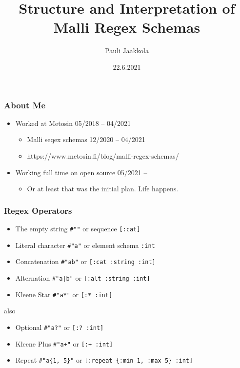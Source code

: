 \documentclass{beamer}
\title{Structure and Interpretation of Malli Regex Schemas}
\author{Pauli Jaakkola}
\date{22.6.2021}
\begin{document}
\frame{\titlepage}


\begin{frame}
\frametitle{About Me}

\begin{itemize}
\item Worked at Metosin 05/2018 -- 04/2021
\begin{itemize}
    \item Malli seqex schemas 12/2020 -- 04/2021
    \item https://www.metosin.fi/blog/malli-regex-schemas/
\end{itemize}
\item Working full time on open source 05/2021 --
\begin{itemize}
    \item Or at least that was the initial plan. Life happens.
\end{itemize}
\end{itemize}
\end{frame}


\begin{frame}
\frametitle{Regex Operators}

\begin{itemize}
\item The empty string \texttt{\#""} or sequence \texttt{[:cat]}
\item Literal character \texttt{\#"a"} or element schema \texttt{:int}
\item Concatenation \texttt{\#"ab"} or \texttt{[:cat :string :int]}
\item Alternation \texttt{\#"a|b"} or \texttt{[:alt :string :int]}
\item Kleene Star \texttt{\#"a*"} or \texttt{[:* :int]}
\end{itemize}

also

\begin{itemize}
\item Optional \texttt{\#"a?"} or \texttt{[:? :int]}
\item Kleene Plus \texttt{\#"a+"} or \texttt{[:+ :int]}
\item Repeat \texttt{\#"a\{1, 5\}"} or \texttt{[:repeat \{:min 1, :max 5\} :int]}
\end{itemize}

\end{frame}

\end{document}
